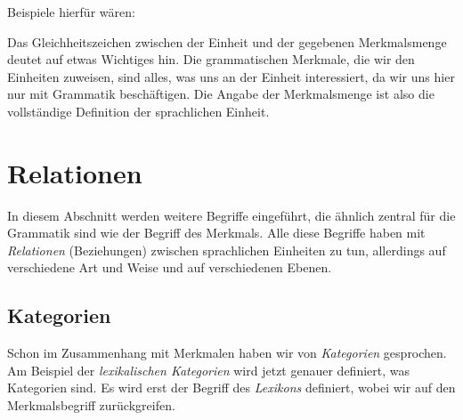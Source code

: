 \begin{exe}
\end{exe}

Beispiele hierfür wären:

\begin{exe}
  \ex
  \begin{xlist}
  \end{xlist}
\end{exe}

Das Gleichheitszeichen zwischen der Einheit und der gegebenen Merkmalsmenge deutet auf etwas Wichtiges hin.
Die grammatischen Merkmale, die wir den Einheiten zuweisen, sind alles, was uns an der Einheit interessiert, da wir uns hier nur mit Grammatik beschäftigen.
Die Angabe der Merkmalsmenge ist also die vollständige Definition der sprachlichen Einheit.

\section{Relationen}

\label{sec:relationengrundbegriffe}

In diesem Abschnitt werden weitere Begriffe eingeführt, die ähnlich zentral für die Grammatik sind wie der Begriff des Merkmals.
Alle diese Begriffe haben mit \textit{Relationen} (Beziehungen) zwischen sprachlichen Einheiten zu tun, allerdings auf verschiedene Art und Weise und auf verschiedenen Ebenen.

\subsection{Kategorien}

\label{sec:kategorien}


Schon im Zusammenhang mit Merkmalen haben wir von \textit{Kategorien} gesprochen.
Am Beispiel der \textit{lexikalischen Kategorien} wird jetzt genauer definiert, was Kategorien sind.
Es wird erst der Begriff des \textit{Lexikons} definiert, wobei wir auf den Merkmalsbegriff zurückgreifen.

